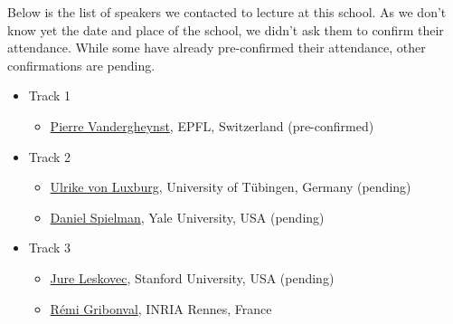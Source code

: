 \documentclass[a4paper]{scrartcl}
\begin{document}
Below is the list of speakers we contacted to lecture at this school. As we
don't know yet the date and place of the school, we didn't ask them to confirm
their attendance. While some have already pre-confirmed their attendance, other
confirmations are pending.
\begin{itemize}
\setlength{\itemsep}{0pt} \setlength{\parskip}{0pt}
\item Track 1
	\begin{itemize}
	\setlength{\itemsep}{0pt} \setlength{\parskip}{0pt}
	\item \href{http://people.epfl.ch/pierre.vandergheynst}
		{Pierre Vandergheynst}, EPFL, Switzerland
		(pre-confirmed)
	\end{itemize}
\item Track 2
	\begin{itemize}
	\setlength{\itemsep}{0pt} \setlength{\parskip}{0pt}
	\item \href{http://www.wsi.uni-tuebingen.de/lehrstuehle/theory-of-machine-learning/people/ulrike-von-luxburg.html}
		{Ulrike von Luxburg}, University of Tübingen, Germany
		(pending)
	\item \href{http://www.cs.yale.edu/homes/spielman/}
		{Daniel Spielman}, Yale University, USA
		(pending)
	\end{itemize}
\item Track 3
	\begin{itemize}
	\setlength{\itemsep}{0pt} \setlength{\parskip}{0pt}
	\item \href{http://cs.stanford.edu/people/jure/}
		{Jure Leskovec}, Stanford University, USA
		(pending)
	\item \href{http://people.irisa.fr/Remi.Gribonval/}
		{Rémi Gribonval}, INRIA Rennes, France
	\end{itemize}
\end{itemize}
\end{document}
